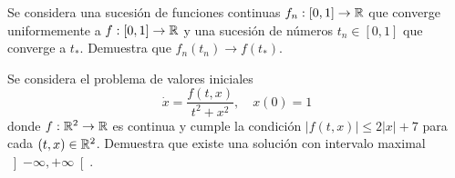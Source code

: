 \documentclass[12pt]{article}
\begin{document}
    \begin{ejercicio}
        Se considera una sucesión de funciones continuas $f_n : \left[0, 1\right] \to \mathbb{R}$ que converge uniformemente a $f : \left[0, 1\right] \to \mathbb{R}$ y una sucesión de números $t_n \in \left[0, 1\right]$ que converge a $t_*$. Demuestra que $f_n(t_n) \to f(t_*)$.
    \end{ejercicio}

    \begin{ejercicio}
        Se considera el problema de valores iniciales
        \[
        \dot{x} = \frac{f(t,x)}{t^2 + x^2}, \quad x(0) = 1
        \]
        donde $f : \mathbb{R}^2 \to \mathbb{R}$ es continua y cumple la condición $|f(t,x)| \leq 2|x| + 7$ para cada $(t,x) \in \mathbb{R}^2$. Demuestra que existe una solución con intervalo maximal $\left]-\infty, +\infty\right[$.
    \end{ejercicio}

    \newpage
    \setcounter{ejercicio}{0} %
\end{document}
